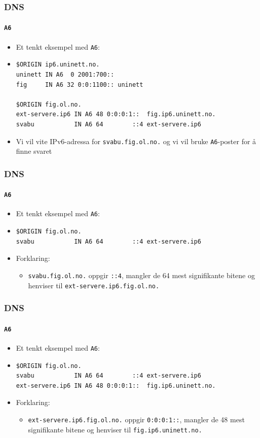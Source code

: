 \begin{frame}[fragile]
  \frametitle{DNS}
  \framesubtitle{\texttt{A6}}
  \begin{itemize}
  \item Et tenkt eksempel med \texttt{A6}:
  \item 
\begin{verbatim}
$ORIGIN ip6.uninett.no.
uninett IN A6  0 2001:700::
fig     IN A6 32 0:0:1100:: uninett

$ORIGIN fig.ol.no.
ext-servere.ip6 IN A6 48 0:0:0:1::  fig.ip6.uninett.no.
svabu           IN A6 64        ::4 ext-servere.ip6
\end{verbatim}
  \item Vi vil vite IPv6-adressa for \texttt{svabu.fig.ol.no.} og vi
    vil bruke \texttt{A6}-poster for å finne svaret
  \end{itemize}
\end{frame}

\begin{frame}[fragile]
  \frametitle{DNS}
  \framesubtitle{\texttt{A6}}
  \begin{itemize}
  \item Et tenkt eksempel med \texttt{A6}:
  \item 
\begin{verbatim}
$ORIGIN fig.ol.no.
svabu           IN A6 64        ::4 ext-servere.ip6
\end{verbatim}
  \item Forklaring:
    \begin{itemize}
    \item \texttt{svabu.fig.ol.no.} oppgir \texttt{::4}, mangler de 64
      mest signifikante bitene og henviser til
      \texttt{ext-servere.ip6.fig.ol.no.}
    \end{itemize}
  \end{itemize}
\end{frame}

\begin{frame}[fragile]
  \frametitle{DNS}
  \framesubtitle{\texttt{A6}}
  \begin{itemize}
  \item Et tenkt eksempel med \texttt{A6}:
  \item 
\begin{verbatim}
$ORIGIN fig.ol.no.
svabu           IN A6 64        ::4 ext-servere.ip6
ext-servere.ip6 IN A6 48 0:0:0:1::  fig.ip6.uninett.no.
\end{verbatim}
  \item Forklaring:
    \begin{itemize}
    \item \texttt{ext-servere.ip6.fig.ol.no.} oppgir
      \texttt{0:0:0:1::}, mangler de 48 mest signifikante bitene og
      henviser til \texttt{fig.ip6.uninett.no.}
    \end{itemize}
  \end{itemize}
\end{frame}

